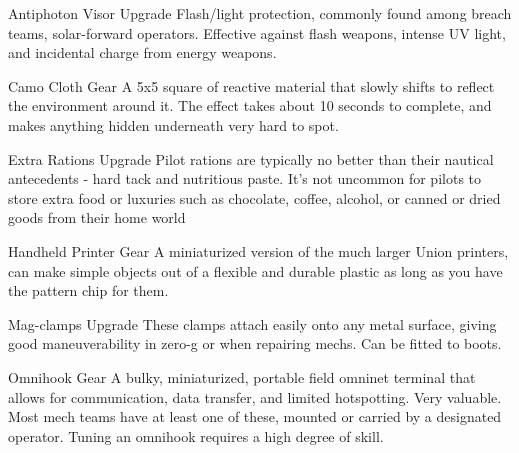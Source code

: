 Antiphoton Visor              Upgrade        Flash/light protection, commonly found among breach teams,  
                                             solar-forward operators. Effective against flash weapons, intense  
                                             UV light, and incidental charge from energy weapons.  

Camo Cloth                    Gear           A 5x5 square of reactive material that slowly shifts to reflect the  
                                             environment around it. The effect takes about 10 seconds to  
                                             complete, and makes anything hidden underneath very hard to  
                                             spot. 

Extra Rations                 Upgrade        Pilot rations are typically no better than their nautical antecedents  
                                             - hard tack and nutritious paste. It’s not uncommon for pilots to  
                                             store extra food or luxuries such as chocolate, coffee, alcohol, or  
                                             canned or dried goods from their home world 

Handheld Printer              Gear           A miniaturized version of the much larger Union printers, can  
                                             make simple objects out of a flexible and durable plastic as long  
                                             as you have the pattern chip for them. 

Mag-clamps                    Upgrade        These clamps attach easily onto any metal surface, giving good  
                                             maneuverability in zero-g or when repairing mechs. Can be fitted  
                                             to boots. 

                                                                                                                        


Omnihook                      Gear           A bulky, miniaturized, portable field omninet terminal that allows  
                                             for communication, data transfer, and limited hotspotting. Very  
                                             valuable. Most mech teams have at least one of these, mounted  
                                             or carried by a designated operator. Tuning an omnihook requires  
                                             a high degree of skill. 


